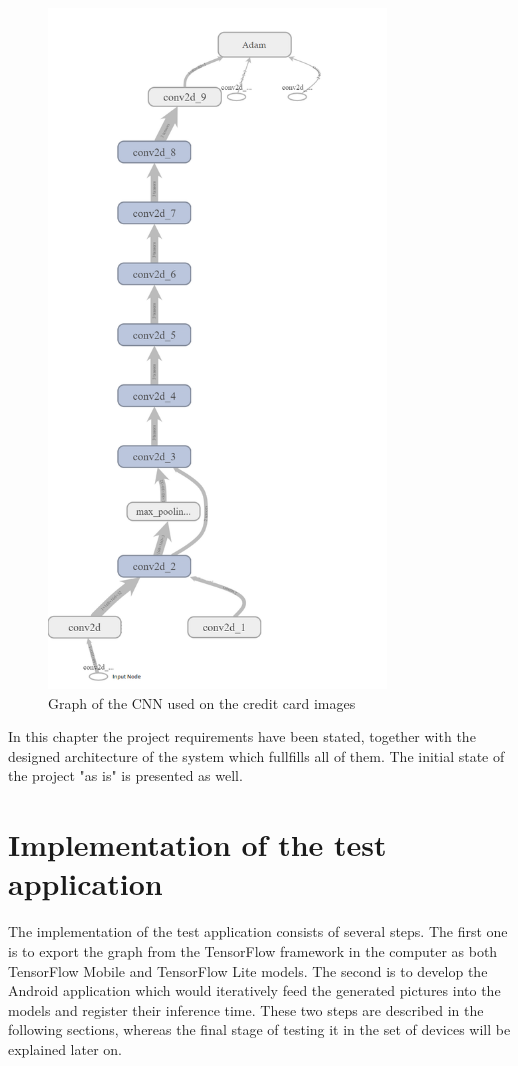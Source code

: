 \begin{figure}[p!]
\centering
  \includegraphics[width=0.8\textwidth]{img/Tensorboard.png}
  \caption{\small Graph of the CNN used on the credit card images}
  \label{fig:tensorboard}
\end{figure}

In this chapter the project requirements have been stated, together with the designed architecture of the system which fullfills all of them. The initial state of the project "as is" is presented as well. \\

\newpage
\section{Implementation of the test application}
The implementation of the test application consists of several steps. The first one is to export the graph from the TensorFlow framework in the computer as both TensorFlow Mobile and TensorFlow Lite models. The second is to develop the Android application which would iteratively feed the generated pictures into the models and register their inference time. These two steps are described in the following sections, whereas the final stage of testing it in the set of devices will be explained later on. 


